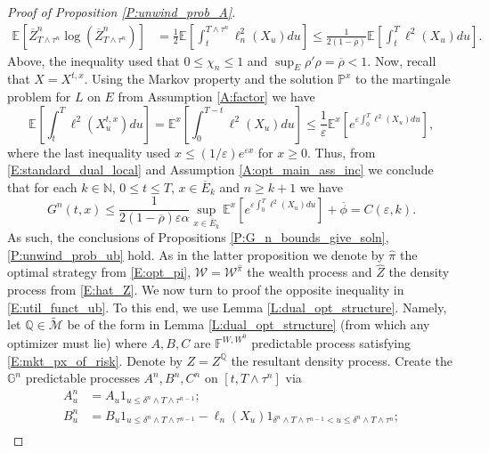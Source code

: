 \documentclass[11pt, letterpaper]{amsart}
\theoremstyle{definition}
\theoremstyle{remark}
\numberwithin{equation}{section}
\newcommand{\nats}{\mathbb N}
\newcommand{\eps}{\varepsilon}
\newcommand{\We}{\mathcal{W}}
\newcommand{\hwe}{\hat{\We}}
\newcommand{\hz}{\hat{Z}}
\newcommand{\hpi}{\hat{\pi}}
\newcommand{\prob}{\mathbb{P}}
\newcommand{\qprob}{\mathbb{Q}}
\newcommand{\esp}{\mathbb{E}}
\newcommand{\espalt}[2]{\esp^{#1}\bra{#2}}
\newcommand{\tM}{\widetilde{\mathcal{M}}}
\newcommand{\filt}{\mathbb{F}}
\newcommand{\filtg}{\mathbb{G}}
\newcommand{\bra}[1]{\left[#1\right]}
\newcommand{\ol}[1]{\overline{#1}}
\begin{document}
\begin{proof}[Proof of Proposition \ref{P:unwind_prob_A}]
\begin{equation*}
\begin{split}
\espalt{}{\ol{Z}^n_{T\wedge\tau^n}\log\left(\ol{Z}^n_{T\wedge\tau^n}\right)} &= \frac{1}{2}\espalt{}{\int_t^{T\wedge\tau^n} \ell_n^2(X_u)du}\leq \frac{1}{2(1-\ol{\rho})}\espalt{}{\int_t^T \ell^2(X_u)du}.
\end{split}
\end{equation*}
Above, the inequality used that $0\leq\chi_n\leq 1$ and $\sup_{E}\rho'\rho  = \ol{\rho} < 1$.  Now, recall that $X = X^{t,x}$.  Using the Markov property and the solution $\prob^x$ to the martingale problem for $L$ on $E$ from Assumption \ref{A:factor} we have
\begin{equation*}
\espalt{}{\int_t^T \ell^2(X^{t,x}_u)du} = \espalt{x}{\int_0^{T-t}\ell^2(X_u)du} \leq \frac{1}{\eps}\espalt{x}{e^{\eps\int_0^T \ell^2(X_u)du}},
\end{equation*}
where the last inequality used $x\leq (1/\eps) e^{\eps x}$ for $x\geq 0$.  Thus, from \eqref{E:standard_dual_local} and Assumption \ref{A:opt_main_ass_inc} we conclude that for each $k\in\nats$, $0\leq t\leq T$, $x\in \ol{E}_k$ and $n\geq k+1$ we have
\begin{equation*}
G^n(t,x) \leq \frac{1}{2(1-\ol{\rho})\eps\alpha} \sup_{x\in\ol{E}_k}\espalt{x}{e^{\eps\int_0^T \ell^2(X_u)du}} + \ol{\phi} = C(\eps,k).
\end{equation*}
As such, the conclusions of Propositions \ref{P:G_n_bounds_give_soln}, \ref{P:unwind_prob_ub} hold.  As in the latter proposition we denote by $\hpi$ the optimal strategy from \eqref{E:opt_pi}, $\hwe = \We^{\hpi}$ the wealth process and $\hz$ the density process from \eqref{E:hat_Z}.  We now turn to proof the opposite inequality in \eqref{E:util_funct_ub}.  To this end, we use Lemma \ref{L:dual_opt_structure}. Namely, let $\qprob\in\tM$ be of the form in Lemma \ref{L:dual_opt_structure}  (from which any optimizer must lie) where $A,B,C$ are $\filt^{W,W^0}$ predictable process satisfying \eqref{E:mkt_px_of_risk}.  Denote by $Z = Z^\qprob$ the resultant density process. Create the $\filtg^n$ predictable processes $A^n,B^n,C^n$ on $[t,T\wedge\tau^n]$ via
\begin{equation*}
\begin{split}
A^n_u &= A_u1_{u\leq \delta^n \wedge T\wedge \tau^{n-1}};\\
B^n_u &= B_u 1_{u\leq \delta^n \wedge T\wedge \tau^{n-1}} - \ell_n(X_u)1_{\delta^n\wedge T\wedge \tau^{n-1} < u \leq \delta^n\wedge T\wedge\tau^n};\\

\end{split}
\end{equation*}
\end{proof}
\end{document}
